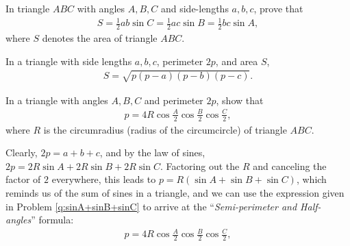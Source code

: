 \begin{tcolorbox}
    \begin{question}[name=Area Using Law of Sines]
        In triangle $ABC$ with angles $A,B,C$ and side-lengths $a,b,c$, prove that
        \begin{align*}
            S = \frac{1}{2} ab \sin C = \frac{1}{2} ac \sin B = \frac{1}{2} bc \sin A,
        \end{align*}
        where $S$ denotes the area of triangle $ABC$.
    \end{question}
\end{tcolorbox}

\begin{tcolorbox}
    \begin{question}[name=Heron's Formula]
    In a triangle with side lengths $a,b,c$, perimeter $2p$, and area $S$,
    \begin{align*}
        S= \sqrt{p(p-a)(p-b)(p-c)}.
    \end{align*}
\end{question}
\end{tcolorbox}


\begin{tcolorbox}
    \begin{question}[name=Semi-perimeter and Cosine of Half-angles]\label{q:semiperimeter-halfangles}
        In a triangle with angles $A,B,C$ and perimeter $2p$, show that
        \begin{align*}
            p = 4R \cos \frac{A}{2} \cos \frac{B}{2} \cos \frac{C}{2},
        \end{align*}
        where $R$ is the circumradius (radius of the circumcircle) of triangle $ABC$.
    \end{question}
\end{tcolorbox}

\begin{solution}
    Clearly, $2p=a+b+c$, and by the law of sines, $2p=2R\sin A + 2R\sin B + 2R \sin C$. Factoring out the $R$ and canceling the factor of $2$ everywhere, this leads to $p=R(\sin A + \sin B + \sin C)$, which reminds us of the sum of sines in a triangle, and we can use the expression given in Problem \ref{q:sinA+sinB+sinC} to arrive at the ``\textit{Semi-perimeter and Half-angles}'' formula:
        \begin{align*}
            p = 4R \cos \frac{A}{2} \cos \frac{B}{2} \cos \frac{C}{2},
        \end{align*}
\end{solution}

